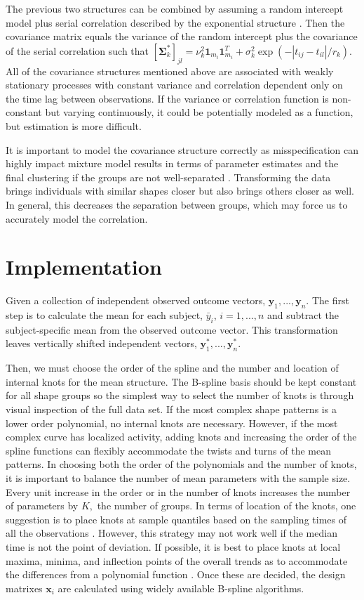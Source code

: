 \documentclass[12pt]{article}
\newcommand{\B}[0]{\mathbf}
\begin{document}
The previous two structures can be combined by assuming a random intercept model plus serial correlation described by the exponential structure \cite{diggle2002}. Then the covariance matrix equals the variance of the random intercept plus the covariance of the serial correlation such that $[\B \Sigma^{*}_{k}]_{jl}=\nu^{2}_{k}\B 1_{m_{i}}\B 1^{T}_{m_{i}}+\sigma_{k}^{2}\exp(-| t_{ij}-t_{il}| / r_{k})$.\\

All of the covariance structures mentioned above are associated with weakly stationary processes with constant variance and correlation dependent only on the time lag between observations. If the variance or correlation function is non-constant but varying continuously, it could be potentially modeled as a function, but estimation is more difficult.

It is important to model the covariance structure correctly as misspecification can highly impact mixture model results in terms of parameter estimates and the final clustering if the groups are not well-separated \cite{heggeseth2013}. Transforming the data brings individuals with similar shapes closer but also brings others closer as well. In general, this decreases the separation between groups, which may force us to accurately model the correlation. 

\section{Implementation}
Given a collection of independent observed outcome vectors, $\B y_{1},...,\B y_{n}$. The first step is to calculate the mean for each subject, $\bar{y}_{i}$, $i=1,...,n$ and subtract the subject-specific mean from the observed outcome vector. This transformation leaves vertically shifted independent vectors, $\B y^{*}_{1},...,\B y^{*}_{n}$.  

Then, we must choose the order of the spline and the number and location of internal knots for the mean structure. The B-spline basis should be kept constant for all shape groups so the simplest way to select the number of knots is through visual inspection of the full data set. If the most complex shape patterns is a lower order polynomial, no internal knots are necessary. However, if the most complex curve has localized activity, adding knots and increasing the order of the spline functions can flexibly accommodate the twists and turns of the mean patterns. In choosing both the order of the polynomials and the number of knots, it is important to balance the number of mean parameters with the sample size. Every unit increase in the order or in the number of knots increases the number of parameters by $K,$ the number of groups. In terms of location of the knots, one suggestion is to place knots at sample quantiles based on the sampling times of all the observations \cite{ruppert2002}. However, this strategy may not work well if the median time is not the point of deviation. If possible, it is best to place knots at local maxima, minima, and inflection points of the overall trends as to accommodate the differences from a polynomial function \cite{eubank1999}.  Once these are decided, the design matrixes $\B x_{i}$ are calculated using widely available B-spline algorithms. 
\end{document}
